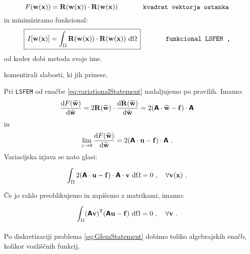 \begin{equation}
	F(\mathbf{w(x)}) = \mathbf{R(w(x))} \cdot \mathbf{R(w(x))} \hspace{1.3cm} \texttt{kvadrat vektorja ostanka}
\end{equation}
in minimiziramo funkcional:
\begin{equation}
	\boxed{\, I[\mathbf{w(x)}] = \int_{\Omega} \mathbf{R(w(x))} \cdot \mathbf{R(w(x))} \ \mathrm{d} \Omega \,} \hspace{1.3cm} \texttt{funkcional LSFEM ,}
\end{equation}
od koder dobi metoda svoje ime.

komentirali slabosti, ki jih prinese.

Pri \texttt{LSFEM} od enačbe \eqref{eq:variationalStatement} nadaljujemo po pravilih. Imamo:
\begin{equation}
	\frac{\mathrm{d} F(\widetilde{\mathbf{w}})}{\mathrm{d} \widetilde{\mathbf{w}}} = 2 \mathbf{R(\widetilde{w})} \cdot \frac{\mathrm{d} \mathbf{R(\widetilde{w})}}{\mathrm{d} \mathbf{\widetilde{w}}} = 2 (\bm{\mathsf{A}} \cdot \mathbf{\widetilde{w}} - \mathbf{f}) \cdot \bm{\mathsf{A}}
\end{equation}
in
\begin{equation}
	\lim_{\varepsilon \rightarrow 0} \frac{\mathrm{d} F(\widetilde{\mathbf{w}})}{\mathrm{d} \widetilde{\mathbf{w}}} = 2 (\bm{\mathsf{A}} \cdot \mathbf{u} - \mathbf{f}) \cdot \bm{\mathsf{A}} \ .
\end{equation}
Variacijska izjava se nato glasi:
\begin{equation}
	\int_{\Omega} 2 (\mathbsf{A} \cdot \mathbf{u} - \mathbf{f}) \cdot \mathbsf{A} \cdot \mathbf{v} \ \ud \Omega = 0 \ , \quad \forall \mathbf{v(\mathbf{x})} \ . \vphantom{\Biggr{)}}
\end{equation}
Če jo rahlo preoblikujemo in zapišemo z matrikami, imamo:
\begin{equation}
	\int_{\Omega} (\mathbsf{A} \mathbf{v})^\mathsf{T} (\mathbsf{A} \mathbf{u} - \mathbf{f}) \ \ud \Omega = 0 \ , \quad \forall \mathbf{v} \ . \vphantom{\Biggr{)}}
\end{equation}

Po diskretizaciji problema \eqref{eq:GfemStatement} dobimo toliko algebrajskih enačb, kolikor vozliščnih funkcij.